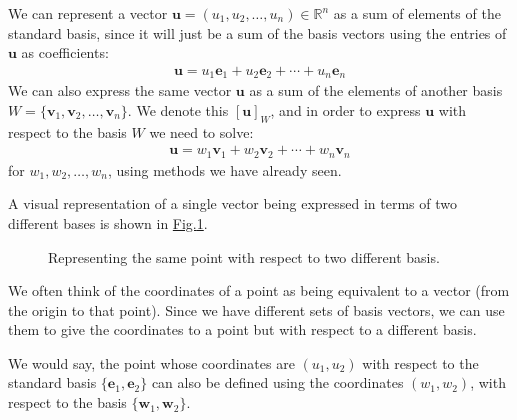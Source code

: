\documentclass[letterpaper,10pt,english]{jupyterBook}
\let\sphinxpxdimen\pdfpxdimen\else\newdimen\sphinxpxdimen
\begin{document}
\sphinxAtStartPar
We can represent a vector \(\mathbf{u} = (u_1, u_2, \ldots, u_n) \in \mathbb{R}^n\) as a sum of elements of the standard basis, since it will just be a sum of the basis vectors using the entries of \(\mathbf{u}\) as coefficients:
\begin{equation*}
\begin{split}\mathbf{u} = u_1 \mathbf{e}_1 + u_2 \mathbf{e}_2 + \cdots + u_n \mathbf{e}_n \end{split}
\end{equation*}
\sphinxAtStartPar
We can also express the same vector \(\mathbf{u}\) as a sum of the elements of another basis \(W = \{\mathbf{v}_1, \mathbf{v}_2, \ldots, \mathbf{v}_n\}\). We denote this \([\mathbf{u}]_W\), and in order to express \(\mathbf{u}\) with respect to the basis \(W\) we need to solve:
\begin{equation*}
\begin{split} \mathbf{u} = w_1 \mathbf{v}_1 + w_2 \mathbf{v}_2 + \cdots + w_n \mathbf{v}_n\end{split}
\end{equation*}
\sphinxAtStartPar
for \(w_1, w_2, \ldots, w_n\), using methods we have already seen.

\sphinxAtStartPar
A visual representation of a single vector being expressed in terms of two different bases is shown in \hyperref[\detokenize{_pages/5.4_Basis:change-of-basis-figure}]{Fig.\@ \ref{\detokenize{_pages/5.4_Basis:change-of-basis-figure}}}.

\begin{figure}[htbp]
\centering
\capstart

\noindent\sphinxincludegraphics[width=400\sphinxpxdimen]{{5_change_of_basis}.svg}
\caption{Representing the same point with respect to two different basis.}\label{\detokenize{_pages/5.4_Basis:change-of-basis-figure}}\end{figure}

\sphinxAtStartPar
We often think of the coordinates of a point as being equivalent to a vector (from the origin to that point). Since we have different sets of basis vectors, we can use them to give the coordinates to a point but with respect to a different basis.

\sphinxAtStartPar
We would say, the point whose co\sphinxhyphen{}ordinates are \((u_1, u_2)\) with respect to the standard basis \(\{ \mathbf{e}_1, \mathbf{e}_2\}\) can also be defined using the co\sphinxhyphen{}ordinates \((w_1, w_2)\), with respect to the basis \(\{ \mathbf{w}_1, \mathbf{w}_2 \}\).
\end{document}

